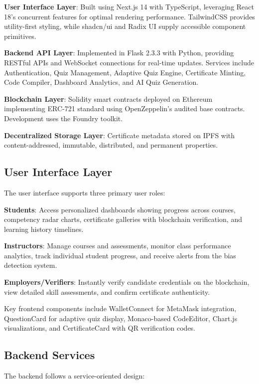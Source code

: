 \documentclass[conference]{IEEEtran}
\begin{document}
\textbf{User Interface Layer}: Built using Next.js 14 with TypeScript, leveraging React 18's concurrent features for optimal rendering performance. TailwindCSS provides utility-first styling, while shadcn/ui and Radix UI supply accessible component primitives.

\textbf{Backend API Layer}: Implemented in Flask 2.3.3 with Python, providing RESTful APIs and WebSocket connections for real-time updates. Services include Authentication, Quiz Management, Adaptive Quiz Engine, Certificate Minting, Code Compiler, Dashboard Analytics, and AI Quiz Generation.

\textbf{Blockchain Layer}: Solidity smart contracts deployed on Ethereum implementing ERC-721 standard using OpenZeppelin's audited base contracts. Development uses the Foundry toolkit.

\textbf{Decentralized Storage Layer}: Certificate metadata stored on IPFS with content-addressed, immutable, distributed, and permanent properties.

\subsection{User Interface Layer}

The user interface supports three primary user roles:

\textbf{Students}: Access personalized dashboards showing progress across courses, competency radar charts, certificate galleries with blockchain verification, and learning history timelines.

\textbf{Instructors}: Manage courses and assessments, monitor class performance analytics, track individual student progress, and receive alerts from the bias detection system.

\textbf{Employers/Verifiers}: Instantly verify candidate credentials on the blockchain, view detailed skill assessments, and confirm certificate authenticity.

Key frontend components include WalletConnect for MetaMask integration, QuestionCard for adaptive quiz display, Monaco-based CodeEditor, Chart.js visualizations, and CertificateCard with QR verification codes.

\subsection{Backend Services}

The backend follows a service-oriented design:
\end{document}
